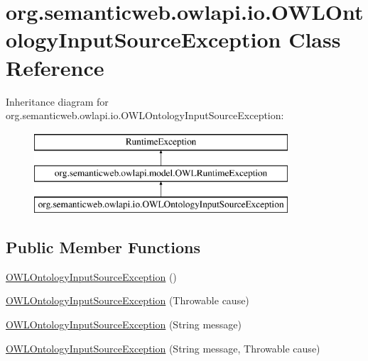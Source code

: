 \hypertarget{classorg_1_1semanticweb_1_1owlapi_1_1io_1_1_o_w_l_ontology_input_source_exception}{\section{org.\-semanticweb.\-owlapi.\-io.\-O\-W\-L\-Ontology\-Input\-Source\-Exception Class Reference}
\label{classorg_1_1semanticweb_1_1owlapi_1_1io_1_1_o_w_l_ontology_input_source_exception}
}
Inheritance diagram for org.\-semanticweb.\-owlapi.\-io.\-O\-W\-L\-Ontology\-Input\-Source\-Exception\-:\begin{figure}[H]
\begin{center}
\leavevmode
\includegraphics[height=3.000000cm]{classorg_1_1semanticweb_1_1owlapi_1_1io_1_1_o_w_l_ontology_input_source_exception}
\end{center}
\end{figure}
\subsection*{Public Member Functions}
\begin{DoxyCompactItemize}
\item 
\hyperlink{classorg_1_1semanticweb_1_1owlapi_1_1io_1_1_o_w_l_ontology_input_source_exception_a3ba5be0d36526d5b7d662dd79888b1aa}{O\-W\-L\-Ontology\-Input\-Source\-Exception} ()
\item 
\hyperlink{classorg_1_1semanticweb_1_1owlapi_1_1io_1_1_o_w_l_ontology_input_source_exception_a9356a3babab53f75fd8b05060e1523fb}{O\-W\-L\-Ontology\-Input\-Source\-Exception} (Throwable cause)
\item 
\hyperlink{classorg_1_1semanticweb_1_1owlapi_1_1io_1_1_o_w_l_ontology_input_source_exception_a1be4d73786136e16ffb85715a8e92732}{O\-W\-L\-Ontology\-Input\-Source\-Exception} (String message)
\item 
\hyperlink{classorg_1_1semanticweb_1_1owlapi_1_1io_1_1_o_w_l_ontology_input_source_exception_aa1d3970072051b8dc5e134f1c0feb8a9}{O\-W\-L\-Ontology\-Input\-Source\-Exception} (String message, Throwable cause)
\end{DoxyCompactItemize}

